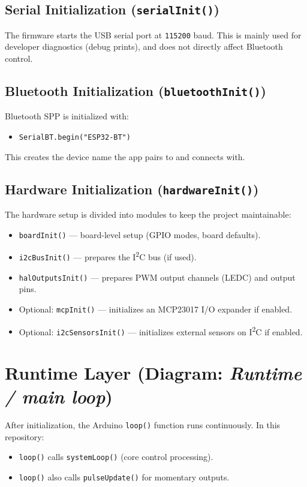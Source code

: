 \subsection{Serial Initialization (\texttt{serialInit()})}
The firmware starts the USB serial port at \texttt{115200} baud.
This is mainly used for developer diagnostics (debug prints), and does not directly affect Bluetooth control.

\subsection{Bluetooth Initialization (\texttt{bluetoothInit()})}
Bluetooth SPP is initialized with:
\begin{itemize}
    \item \texttt{SerialBT.begin("ESP32-BT")}
\end{itemize}
This creates the device name the app pairs to and connects with.

\subsection{Hardware Initialization (\texttt{hardwareInit()})}
The hardware setup is divided into modules to keep the project maintainable:

\begin{itemize}
    \item \texttt{boardInit()} --- board-level setup (GPIO modes, board defaults).
    \item \texttt{i2cBusInit()} --- prepares the I\textsuperscript{2}C bus (if used).
    \item \texttt{halOutputsInit()} --- prepares PWM output channels (LEDC) and output pins.
    \item Optional: \texttt{mcpInit()} --- initializes an MCP23017 I/O expander if enabled.
    \item Optional: \texttt{i2cSensorsInit()} --- initializes external sensors on I\textsuperscript{2}C if enabled.
\end{itemize}

\section{Runtime Layer (Diagram: \textit{Runtime / main loop})}

After initialization, the Arduino \texttt{loop()} function runs continuously.
In this repository:
\begin{itemize}
    \item \texttt{loop()} calls \texttt{systemLoop()} (core control processing).
    \item \texttt{loop()} also calls \texttt{pulseUpdate()} for momentary outputs.
\end{itemize}

